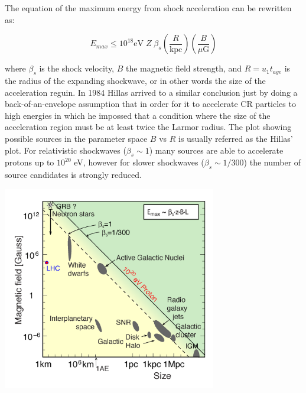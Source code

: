 \documentclass[
  letterpaper,
  DIV=11,
  numbers=noendperiod]{scrreprt}
\begin{document}
\begin{tcolorbox}[enhanced jigsaw, colframe=quarto-callout-note-color-frame, leftrule=.75mm, left=2mm, opacitybacktitle=0.6, colbacktitle=quarto-callout-note-color!10!white, coltitle=black, arc=.35mm, titlerule=0mm, toprule=.15mm, opacityback=0, bottomrule=.15mm, breakable, bottomtitle=1mm, rightrule=.15mm, toptitle=1mm, colback=white, title=\textcolor{quarto-callout-note-color}{\faInfo}\hspace{0.5em}{Hillas Criteria}]

The equation of the maximum energy from shock acceleration can be
rewritten as:

\[E_{max} \leq 10^{18} \mathrm{eV}\; Z \;\beta_s \left(\frac{R}{\mathrm{kpc}}\right)\left(\frac{B}{\mu\mathrm{G}}\right)\]

where \(\beta_s\) is the shock velocity, \(B\) the magnetic field
strength, and \(R = u_1 t_{age}\) is the radius of the expanding
shockwave, or in other words the size of the acceleration reguin. In
1984 Hillas arrived to a similar conclusion just by doing a
back-of-an-envelope assumption that in order for it to accelerate CR
particles to high energies in which he impossed that a condition where
the size of the acceleration region must be at least twice the Larmor
radius. The plot showing possible sources in the parameter space \(B\)
vs \(R\) is usually referred as the Hillas' plot. For relativistic
shockwaves (\(\beta_s \sim 1\)) many sources are able to accelerate
protons up to \(10^{20}\) eV, however for slower shockwaves
(\(\beta_s \sim 1/300\)) the number of source candidates is strongly
reduced.

\begin{center}
\includegraphics[width=0.7\textwidth,height=\textheight]{images/Hillas_plot.png}
\end{center}

\end{tcolorbox}
\end{document}
